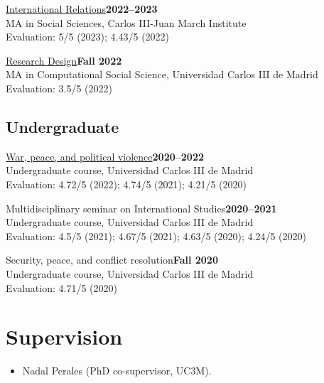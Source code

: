 \documentclass[a4paper, 12pt]{article}
\begin{document}
\noindent
\href{https://raw.githack.com/franvillamil/syllabi/master/current/syllabus_IR.pdf}{International Relations}\hfill\textbf{2022--2023}\\
{\small MA in Social Sciences, Carlos III-Juan March Institute}\\
{\small Evaluation: 5/5 (2023); 4.43/5 (2022)}
\vspace{10pt}

\noindent
\href{https://github.com/franvillamil/syllabi/blob/master/current/syllabus_research_design.pdf}{Research Design}\hfill\textbf{Fall 2022}\\
{\small MA in Computational Social Science, Universidad Carlos III de Madrid}\\
{\small Evaluation: 3.5/5 (2022)}

\vspace{-10pt}
\subsection*{Undergraduate}

\noindent
\href{https://github.com/franvillamil/syllabi/blob/master/current/syllabus_war_peace_political_violence.pdf}{War, peace, and political violence}\hfill\textbf{2020--2022}\\
{\small Undergraduate course, Universidad Carlos III de Madrid}\\
{\small Evaluation: 4.72/5 (2022); 4.74/5 (2021); 4.21/5 (2020)}
\vspace{10pt}

\noindent
Multidisciplinary seminar on International Studies\hfill\textbf{2020--2021}\\
{\small Undergraduate course, Universidad Carlos III de Madrid}\\
{\small Evaluation: 4.5/5 (2021); 4.67/5 (2021); 4.63/5 (2020); 4.24/5 (2020)}
\vspace{10pt}

\noindent
Security, peace, and conflict resolution\hfill\textbf{Fall 2020}\\
{\small Undergraduate course, Universidad Carlos III de Madrid}\\
{\small Evaluation: 4.71/5 (2020)}

\section*{Supervision}

\begin{itemize}[leftmargin=*, nolistsep]
	\item Nadal Perales (PhD co-supervisor, UC3M).
\end{itemize}
\end{document}
